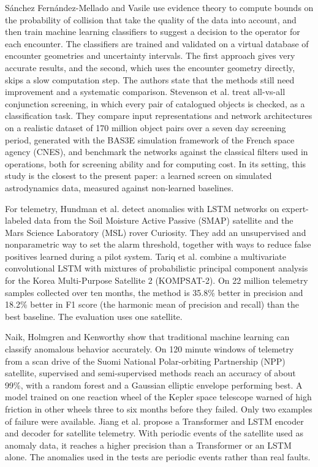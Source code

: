 Sánchez Fernández-Mellado and Vasile \cite{sanchez2021} use evidence theory to compute bounds on the probability of collision that take the quality of the data into account, and then train machine learning classifiers to suggest a decision to the operator for each encounter. The classifiers are trained and validated on a virtual database of encounter geometries and uncertainty intervals. The first approach gives very accurate results, and the second, which uses the encounter geometry directly, skips a slow computation step. The authors state that the methods still need improvement and a systematic comparison. Stevenson et al. \cite{stevenson2023} treat all-vs-all conjunction screening, in which every pair of catalogued objects is checked, as a classification task. They compare input representations and network architectures on a realistic dataset of 170 million object pairs over a seven day screening period, generated with the BAS3E simulation framework of the French space agency (CNES), and benchmark the networks against the classical filters used in operations, both for screening ability and for computing cost. In its setting, this study is the closest to the present paper: a learned screen on simulated astrodynamics data, measured against non-learned baselines.

For telemetry, Hundman et al. \cite{hundman2018} detect anomalies with LSTM networks on expert-labeled data from the Soil Moisture Active Passive (SMAP) satellite and the Mars Science Laboratory (MSL) rover Curiosity. They add an unsupervised and nonparametric way to set the alarm threshold, together with ways to reduce false positives learned during a pilot system. Tariq et al. \cite{tariq2019} combine a multivariate convolutional LSTM with mixtures of probabilistic principal component analysis for the Korea Multi-Purpose Satellite 2 (KOMPSAT-2). On 22 million telemetry samples collected over ten months, the method is 35.8\% better in precision and 18.2\% better in F1 score (the harmonic mean of precision and recall) than the best baseline. The evaluation uses one satellite.

Naik, Holmgren and Kenworthy \cite{naik2020} show that traditional machine learning can classify anomalous behavior accurately. On 120 minute windows of telemetry from a scan drive of the Suomi National Polar-orbiting Partnership (NPP) satellite, supervised and semi-supervised methods reach an accuracy of about 99\%, with a random forest and a Gaussian elliptic envelope performing best. A model trained on one reaction wheel of the Kepler space telescope warned of high friction in other wheels three to six months before they failed. Only two examples of failure were available. Jiang et al. \cite{jiang2023} propose a Transformer and LSTM encoder and decoder for satellite telemetry. With periodic events of the satellite used as anomaly data, it reaches a higher precision than a Transformer or an LSTM alone. The anomalies used in the tests are periodic events rather than real faults.

